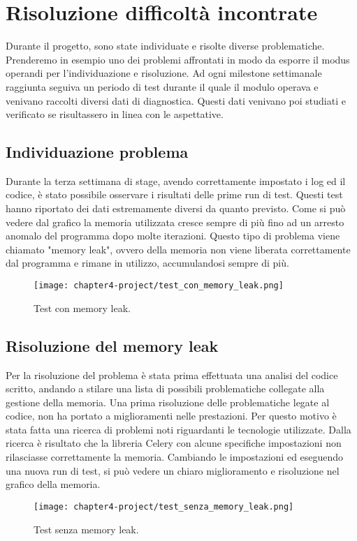 \section{Risoluzione difficoltà incontrate}

Durante il progetto, sono state individuate e risolte diverse problematiche. Prenderemo in esempio uno dei problemi affrontati in modo da esporre il modus operandi per l'individuazione e risoluzione.
Ad ogni milestone settimanale raggiunta seguiva un periodo di test durante il quale il modulo operava e venivano raccolti diversi dati di diagnostica. Questi dati venivano poi studiati e verificato se risultassero in linea con le aspettative.

\subsection{Individuazione problema}
Durante la terza settimana di stage, avendo correttamente impostato i log ed il codice, è stato possibile osservare i risultati delle prime run di test. Questi test hanno riportato dei dati estremamente diversi da quanto previsto. Come si può vedere dal grafico la memoria utilizzata cresce sempre di più fino ad un arresto anomalo del programma dopo molte iterazioni. Questo tipo di problema viene chiamato "memory leak", ovvero della memoria non viene liberata correttamente dal programma e rimane in utilizzo, accumulandosi sempre di più.

\begin{figure}[!h] 
    \centering 
    \texttt{[image: chapter4-project/test\_con\_memory\_leak.png]} 
    \caption{Test con memory leak.}
\end{figure}

\subsection{Risoluzione del memory leak}

Per la risoluzione del problema è stata prima effettuata una analisi del codice scritto, andando a stilare una lista di possibili problematiche collegate alla gestione della memoria. Una prima risoluzione delle problematiche legate al codice, non ha portato a miglioramenti nelle prestazioni. Per questo motivo è stata fatta una ricerca di problemi noti riguardanti le tecnologie utilizzate. Dalla ricerca è risultato che la libreria Celery con alcune specifiche impostazioni non rilasciasse correttamente la memoria. Cambiando le impostazioni ed eseguendo una nuova run di test, si può vedere un chiaro miglioramento e risoluzione nel grafico della memoria.

\begin{figure}[!h] 
    \centering 
    \texttt{[image: chapter4-project/test\_senza\_memory\_leak.png]} 
    \caption{Test senza memory leak.}
\end{figure}